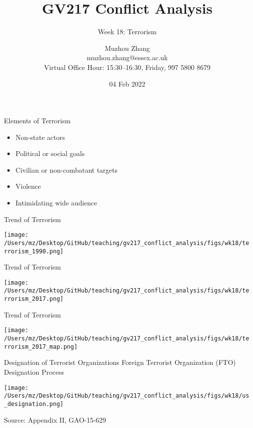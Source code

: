 \documentclass[handout]{beamer}
\title{GV217 Conflict Analysis}
\subtitle{Week 18: Terrorism}
\author{Muzhou Zhang\\ muzhou.zhang@essex.ac.uk\\ Virtual Office Hour: 15:30--16:30, Friday, 997 5800 8679}
\date{04 Feb 2022}
\begin{document}
\maketitle
{}

\begin{frame}{Elements of Terrorism}
    \begin{itemize}
        \pause\item Non-state actors
        \pause\item Political or social goals
        \pause\item Civilian or non-combatant targets 
        \pause\item Violence
        \pause\item Intimidating wide audience
    \end{itemize}
\end{frame}

\begin{frame}{Trend of Terrorism}
    \pause
    \begin{center}
        \texttt{[image: /Users/mz/Desktop/GitHub/teaching/gv217\_conflict\_analysis/figs/wk18/terrorism\_1990.png]}
    \end{center}
\end{frame}

\begin{frame}{Trend of Terrorism}
    \pause
    \begin{center}
        \texttt{[image: /Users/mz/Desktop/GitHub/teaching/gv217\_conflict\_analysis/figs/wk18/terrorism\_2017.png]}
    \end{center}
\end{frame}

\begin{frame}{Trend of Terrorism}
    \pause
    \begin{center}
        \texttt{[image: /Users/mz/Desktop/GitHub/teaching/gv217\_conflict\_analysis/figs/wk18/terrorism\_2017\_map.png]}
    \end{center}
\end{frame}

\begin{frame}{Designation of Terrorist Organizations}
    \pause
    Foreign Terrorist Organization (FTO) Designation Process
    \begin{center}
        \texttt{[image: /Users/mz/Desktop/GitHub/teaching/gv217\_conflict\_analysis/figs/wk18/us\_designation.png]}
    \end{center}
    \footnotesize Source: Appendix II, GAO-15-629
\end{frame}
\end{document}
